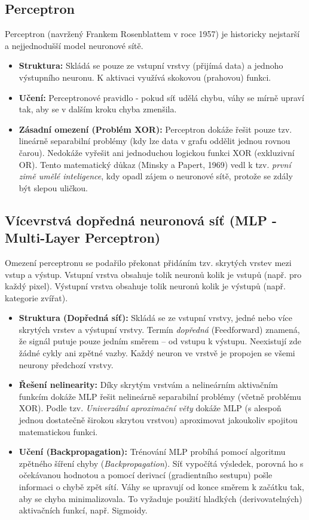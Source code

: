 \subsection{Perceptron}
Perceptron (navržený Frankem Rosenblattem v roce 1957) je historicky nejstarší a nejjednodušší model neuronové sítě. 
\begin{itemize}
    \item \textbf{Struktura:} Skládá se pouze ze vstupní vrstvy (přijímá data) a jednoho výstupního neuronu. K aktivaci využívá skokovou (prahovou) funkci.
    \item \textbf{Učení:} Perceptronové pravidlo - pokud síť udělá chybu, váhy se mírně upraví tak, aby se v dalším kroku chyba zmenšila.
    \item \textbf{Zásadní omezení (Problém XOR):} Perceptron dokáže řešit pouze tzv. lineárně separabilní problémy (kdy lze data v grafu oddělit jednou rovnou čarou). Nedokáže vyřešit ani jednoduchou logickou funkci XOR (exkluzivní OR). Tento matematický důkaz (Minsky a Papert, 1969) vedl k tzv. \textit{první zimě umělé inteligence}, kdy opadl zájem o neuronové sítě, protože se zdály být slepou uličkou.
\end{itemize}

\subsection{Vícevrstvá dopředná neuronová síť (MLP - Multi-Layer Perceptron)}
Omezení perceptronu se podařilo překonat přidáním tzv. skrytých vrstev mezi vstup a výstup.
Vstupní vrstva obsahuje tolik neuronů kolik je vstupů (např. pro každý pixel). Výstupní
vrstva obsahuje tolik neuronů kolik je výstupů (např. kategorie zvířat).

\begin{itemize}
    \item \textbf{Struktura (Dopředná síť):} Skládá se ze vstupní vrstvy, jedné nebo více skrytých vrstev a výstupní vrstvy. Termín \textit{dopředná} (Feedforward) znamená, že signál putuje pouze jedním směrem – od vstupu k výstupu. Neexistují zde žádné cykly ani zpětné vazby.
        Každý neuron ve vrstvě je propojen se všemi neurony předchozí vrstvy.
    \item \textbf{Řešení nelinearity:} Díky skrytým vrstvám a nelineárním aktivačním funkcím dokáže MLP řešit nelineárně separabilní problémy (včetně problému XOR). Podle tzv. \textit{Univerzální aproximační věty} dokáže MLP (s alespoň jednou dostatečně širokou skrytou vrstvou) aproximovat jakoukoliv spojitou matematickou funkci.
    \item \textbf{Učení (Backpropagation):} Trénování MLP probíhá pomocí algoritmu zpětného šíření chyby (\textit{Backpropagation}). Síť vypočítá výsledek, porovná ho s očekávanou hodnotou a pomocí derivací (gradientního sestupu) pošle informaci o chybě zpět sítí. Váhy se upravují od konce směrem k začátku tak, aby se chyba minimalizovala. To vyžaduje použití hladkých (derivovatelných) aktivačních funkcí, např. Sigmoidy.
\end{itemize}

